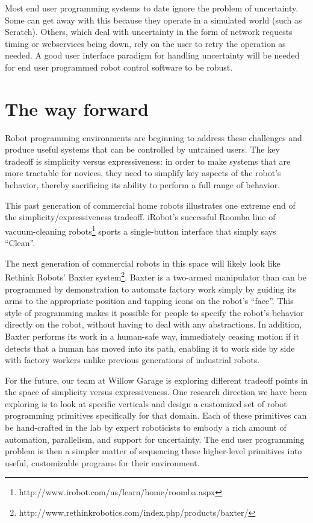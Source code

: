 \documentclass[11pt,twocolumn]{article}
\begin{document}
Most end user programming systems to date ignore the problem of uncertainty. Some can get away with this because they operate in a simulated world (such as Scratch). Others, which deal with uncertainty in the form of network requests timing or webservices being down, rely on the user to retry the operation as needed. A good user interface paradigm for handling uncertainty will be needed for end user programmed robot control software to be robust.

\section{The way forward}

Robot programming environments are beginning to address these challenges and produce useful systems that can be controlled by untrained users. The key tradeoff is simplicity versus expressiveness: in order to make systems that are more tractable for novices, they need to simplify key aspects of the robot's behavior, thereby sacrificing its ability to perform a full range of behavior.

This past generation of commercial home robots illustrates one extreme end of the simplicity/expressiveness tradeoff. iRobot's successful Roomba line of vacuum-cleaning robots\footnote{http://www.irobot.com/us/learn/home/roomba.aspx} sports a single-button interface that simply says ``Clean''.

The next generation of commercial robots in this space will likely look like Rethink Robots' Baxter system\footnote{http://www.rethinkrobotics.com/index.php/products/baxter/}.  Baxter is a two-armed manipulator than can be programmed by demonstration to automate factory work simply by guiding its arms to the appropriate position and tapping icons on the robot's ``face''.  This style of programming makes it possible for people to specify the robot's behavior directly on the robot, without having to deal with any abstractions. In addition, Baxter performs its work in a human-safe way, immediately ceasing motion if it detects that a human has moved into its path, enabling it to work side by side with factory workers unlike previous generations of industrial robots.

For the future, our team at Willow Garage is exploring different tradeoff points in the space of simplicity versus expressiveness. One research direction we have been exploring is to look at specific verticals and design a customized set of robot programming primitives specifically for that domain. Each of these primitives can be hand-crafted in the lab by expert roboticists to embody a rich amount of automation, parallelism, and support for uncertainty. The end user programming problem is then a simpler matter of sequencing these higher-level primitives into useful, customizable programs for their environment.
\end{document}
